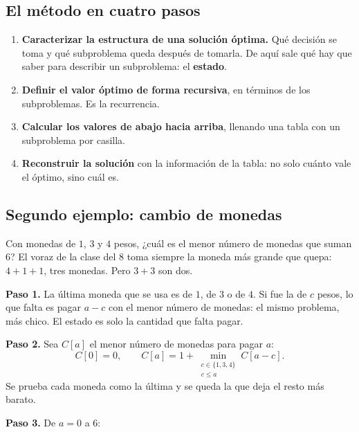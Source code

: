 \documentclass[11pt,letterpaper]{article}
\begin{document}

\subsection*{El método en cuatro pasos}

\begin{enumerate}[itemsep=0.3em]
  \item \textbf{Caracterizar la estructura de una solución óptima.}
        Qué decisión se toma y qué subproblema queda después de
        tomarla. De aquí sale qué hay que saber para describir un
        subproblema: el \textbf{estado}.
  \item \textbf{Definir el valor óptimo de forma recursiva}, en
        términos de los subproblemas. Es la recurrencia.
  \item \textbf{Calcular los valores de abajo hacia arriba}, llenando
        una tabla con un subproblema por casilla.
  \item \textbf{Reconstruir la solución} con la información de la
        tabla: no solo cuánto vale el óptimo, sino cuál es.
\end{enumerate}


\subsection*{Segundo ejemplo: cambio de monedas}

Con monedas de $1$, $3$ y $4$ pesos, ¿cuál es el menor número de
monedas que suman $6$? El voraz de la clase del $8$ toma siempre la
moneda más grande que quepa: $4 + 1 + 1$, tres monedas. Pero
$3 + 3$ son dos.

\textbf{Paso 1.} La última moneda que se usa es de $1$, de $3$ o de
$4$. Si fue la de $c$ pesos, lo que falta es pagar $a - c$ con el menor
número de monedas: el mismo problema, más chico. El estado es solo la
cantidad que falta pagar.

\textbf{Paso 2.} Sea $C[a]$ el menor número de monedas para pagar $a$:
\[
  C[0] = 0 , \qquad
  C[a] = 1 + \min_{\substack{c \in \{1, 3, 4\} \\ c \leq a}} C[a - c] .
\]
Se prueba cada moneda como la última y se queda la que deja el resto
más barato.

\textbf{Paso 3.} De $a = 0$ a $6$:
\end{document}
